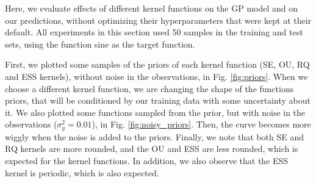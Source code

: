 \documentclass{article}
\begin{document}
Here, we evaluate effects of different kernel functions on the GP model and on our predictions, without optimizing their hyperparameters that were kept at their default. All experiments in this section used 50 samples in the training and test sets, using the function sine as the target function. 

First, we plotted some samples of the priors of each kernel function (SE, OU, RQ and ESS kernels), without noise in the observations, in Fig. \ref{fig:priors}. When we choose a different kernel function, we are changing the shape of the functions priors, that will be conditioned by our training data with some uncertainty about it. We also plotted some functions sampled from the prior, but with noise in the observations ($\sigma_y^2 = 0.01$), in Fig. \ref{fig:noisy_priors}. Then, the curve becomes more wiggly when the noise is added to the priors. Finally, we note that both SE and RQ kernels are more rounded, and the OU and ESS are less rounded, which is expected for the kernel functions. In addition, we also observe that the ESS kernel is periodic, which is also expected.
\end{document}

